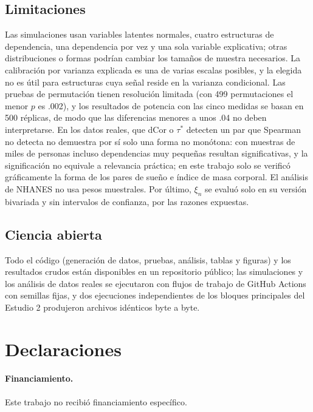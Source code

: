 \documentclass[man,donotrepeattitle,floatsintext]{apa7}
\begin{document}
\subsection{Limitaciones}

Las simulaciones usan variables latentes normales, cuatro estructuras de dependencia, una dependencia por vez y una sola variable explicativa; otras distribuciones o formas podrían cambiar los tamaños de muestra necesarios. La calibración por varianza explicada es una de varias escalas posibles, y la elegida no es útil para estructuras cuya señal reside en la varianza condicional. Las pruebas de permutación tienen resolución limitada (con 499 permutaciones el menor $p$ es .002), y los resultados de potencia con las cinco medidas se basan en 500 réplicas, de modo que las diferencias menores a unos .04 no deben interpretarse. En los datos reales, que dCor o $\tau^*$ detecten un par que Spearman no detecta no demuestra por sí solo una forma no monótona: con muestras de miles de personas incluso dependencias muy pequeñas resultan significativas, y la significación no equivale a relevancia práctica; en este trabajo solo se verificó gráficamente la forma de los pares de sueño e índice de masa corporal. El análisis de NHANES no usa pesos muestrales. Por último, $\xi_n$ se evaluó solo en su versión bivariada y sin intervalos de confianza, por las razones expuestas.

\subsection{Ciencia abierta}

Todo el código (generación de datos, pruebas, análisis, tablas y figuras) y los resultados crudos están disponibles en un repositorio público; las simulaciones y los análisis de datos reales se ejecutaron con flujos de trabajo de GitHub Actions con semillas fijas, y dos ejecuciones independientes de los bloques principales del Estudio 2 produjeron archivos idénticos byte a byte.

\section*{Declaraciones}

\paragraph{Financiamiento.} Este trabajo no recibió financiamiento específico.
\end{document}
